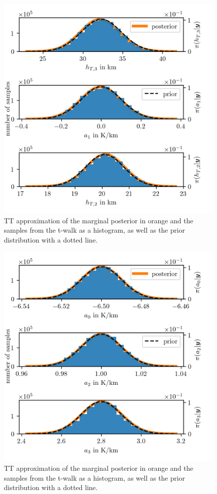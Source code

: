 \begin{figure}[ht!]
	\centering
	\includegraphics{PHdPTPost2.png}
	\caption[Histograms and TT approximation of posterior distribution as well as hyper-prior distribution.]{TT approximation of the marginal posterior in orange and the samples from the t-walk as a histogram, as well as the prior distribution with a dotted line.}
	\label{fig:PostHistTT2}
\end{figure}
\begin{figure}[ht!]
	\centering
	\includegraphics{PHdPTPost3.png}
	\caption[Histograms and TT approximation of posterior distribution as well as hyper-prior distribution.]{TT approximation of the marginal posterior in orange and the samples from the t-walk as a histogram, as well as the prior distribution with a dotted line.}
	\label{fig:PostHistTT3}
\end{figure}
